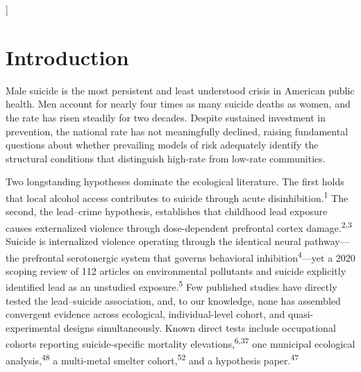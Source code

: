 \documentclass[11pt,twocolumn]{article}
\begin{document}
\begin{@twocolumnfalse}
\begin{abstract}
\noindent\textbf{Conclusions.} Alcohol access does not predict county-level male suicide; environmental lead exposure does, through convergent evidence spanning ecological, individual-level, and quasi-experimental designs. Lead may operate through prefrontal impulse-control failure and sexual dysfunction driving relationship collapse. The ecological design cannot establish individual-level causation; NHANES III mortality-linked files could provide a definitive test but have never been analyzed for lead and suicide. Lead remediation and clinical screening may constitute underrecognized, modifiable suicide prevention strategies.

\medskip
\noindent\textbf{Keywords:} lead exposure, suicide, alcohol access, neurotoxicity, erectile dysfunction, veterans, convergent evidence, cohort studies, dual-pathway model
\end{abstract}
\vspace{1em}
\end{@twocolumnfalse}
]

\section{Introduction}

Male suicide is the most persistent and least understood crisis in American public health. Men account for nearly four times as many suicide deaths as women, and the rate has risen steadily for two decades. Despite sustained investment in prevention, the national rate has not meaningfully declined, raising fundamental questions about whether prevailing models of risk adequately identify the structural conditions that distinguish high-rate from low-rate communities.

Two longstanding hypotheses dominate the ecological literature. The first holds that local alcohol access contributes to suicide through acute disinhibition.\textsuperscript{1} The second, the lead--crime hypothesis, establishes that childhood lead exposure causes externalized violence through dose-dependent prefrontal cortex damage.\textsuperscript{2,3} Suicide is internalized violence operating through the identical neural pathway---the prefrontal serotonergic system that governs behavioral inhibition\textsuperscript{4}---yet a 2020 scoping review of 112 articles on environmental pollutants and suicide explicitly identified lead as an unstudied exposure.\textsuperscript{5} Few published studies have directly tested the lead--suicide association, and, to our knowledge, none has assembled convergent evidence across ecological, individual-level cohort, and quasi-experimental designs simultaneously. Known direct tests include occupational cohorts reporting suicide-specific mortality elevations,\textsuperscript{6,37} one municipal ecological analysis,\textsuperscript{48} a multi-metal smelter cohort,\textsuperscript{52} and a hypothesis paper.\textsuperscript{47}
\end{document}
